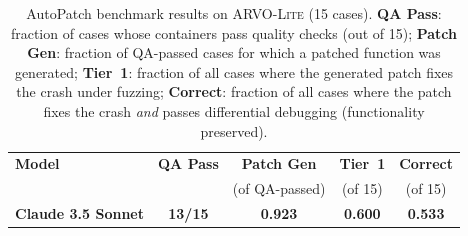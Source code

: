 
\begin{table}[t]
\centering
\small
\caption{AutoPatch benchmark results on \textsc{ARVO-Lite} (15 cases).
  \textbf{QA Pass}: fraction of cases whose containers pass quality checks (out of 15);
  \textbf{Patch Gen}: fraction of QA-passed cases for which a patched function was generated;
  \textbf{Tier~1}: fraction of all cases where the generated patch fixes the crash under fuzzing;
  \textbf{Correct}: fraction of all cases where the patch fixes the crash \emph{and} passes
  differential debugging (functionality preserved).}
\label{tab:results-main}
\begin{tabular}{lcccc}
\toprule
\textbf{Model} & \textbf{QA Pass} & \textbf{Patch Gen} & \textbf{Tier~1} & \textbf{Correct} \\
               &                  & \small(of QA-passed) & \small(of 15) & \small(of 15) \\
\midrule
\textbf{Claude 3.5 Sonnet} & \textbf{13/15} & \textbf{0.923} & \textbf{0.600} & \textbf{0.533} \\
\bottomrule
\end{tabular}
\end{table}
